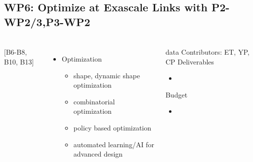 \subsection{WP6: Optimize at Exascale Links with P2-WP2/3,P3-WP2 }
\begin{frame}
  \frametitle{\insertsectionhead}
  \framesubtitle{\insertsubsectionhead}
  \begin{columns}
    [B6-B8, B10, B13]
    \begin{itemize}
      \item Optimization 
      \begin{itemize}
        \item shape, dynamic shape optimization
        \item combinatorial optimization
        \item policy based optimization
        \item automated learning/AI for advanced design
      \end{itemize}
    \end{itemize}
    \begin{alertblock}{data}
      Contributors: ET, YP, CP
      Deliverables
        \begin{itemize}
          \item 
        \end{itemize}
        Budget
        \begin{itemize}
          \item 
        \end{itemize}
    \end{alertblock}
  \end{columns}
\end{frame}

